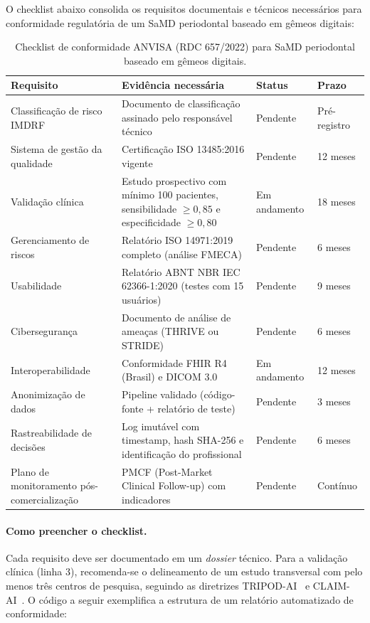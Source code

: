 O checklist abaixo consolida os requisitos documentais e técnicos necessários para conformidade regulatória de um SaMD periodontal baseado em gêmeos digitais:

\begin{table}[htbp]
\centering
\footnotesize
\caption{Checklist de conformidade ANVISA (RDC 657/2022) para SaMD periodontal baseado em gêmeos digitais.}
\label{tab:checklist-anvisa}
\begin{tabular}{|p{3.8cm}|p{5cm}|p{2.5cm}|p{2.5cm}|}
\hline
\textbf{Requisito} & \textbf{Evidência necessária} & \textbf{Status} & \textbf{Prazo} \\
\hline
Classificação de risco IMDRF & Documento de classificação assinado pelo responsável técnico & Pendente & Pré-registro \\
\hline
Sistema de gestão da qualidade & Certificação ISO 13485:2016 vigente & Pendente & 12 meses \\
\hline
Validação clínica & Estudo prospectivo com mínimo 100 pacientes, sensibilidade \(\geq 0,85\) e especificidade \(\geq 0,80\) & Em andamento & 18 meses \\
\hline
Gerenciamento de riscos & Relatório ISO 14971:2019 completo (análise FMECA) & Pendente & 6 meses \\
\hline
Usabilidade & Relatório ABNT NBR IEC 62366-1:2020 (testes com 15 usuários) & Pendente & 9 meses \\
\hline
Cibersegurança & Documento de análise de ameaças (THRIVE ou STRIDE) & Pendente & 6 meses \\
\hline
Interoperabilidade & Conformidade FHIR R4 (Brasil) e DICOM 3.0 & Em andamento & 12 meses \\
\hline
Anonimização de dados & Pipeline validado (código-fonte + relatório de teste) & Pendente & 3 meses \\
\hline
Rastreabilidade de decisões & Log imutável com timestamp, hash SHA-256 e identificação do profissional & Pendente & 6 meses \\
\hline
Plano de monitoramento pós-comercialização & PMCF (Post-Market Clinical Follow-up) com indicadores & Pendente & Contínuo \\
\hline
\end{tabular}
\end{table}

\paragraph{Como preencher o checklist.}
Cada requisito deve ser documentado em um \textit{dossier} técnico. Para a validação clínica (linha 3), recomenda-se o delineamento de um estudo transversal com pelo menos três centros de pesquisa, seguindo as diretrizes TRIPOD-AI~\cite{collins2024tripod} e CLAIM-AI~\cite{claim2024}. O código a seguir exemplifica a estrutura de um relatório automatizado de conformidade:

